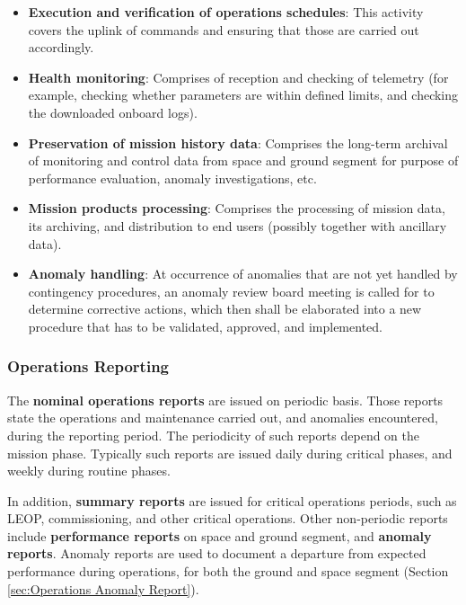 \begin{itemize}
\item \textbf{Execution and verification of operations schedules}: This activity covers the uplink of commands and ensuring that those are carried out accordingly.

\item \textbf{Health monitoring}: Comprises of reception and checking of telemetry (for example, checking whether parameters are within defined limits, and checking the downloaded onboard logs).  

\item \textbf{Preservation of mission history data}: Comprises the long-term archival of monitoring and control data from space and ground segment for purpose of performance evaluation, anomaly investigations, etc.

\item \textbf{Mission products processing}: Comprises the processing of mission data, its archiving, and distribution to end users (possibly together with ancillary data).

\item \textbf{Anomaly handling}: At occurrence of anomalies that are not yet handled by contingency procedures, an anomaly review board meeting is called for to determine corrective actions, which then shall be elaborated into a new procedure that has to be validated, approved, and implemented.

\end{itemize}

\subsubsection{Operations Reporting} 
\label{sec:Operations Reporting}

The \textbf{nominal operations reports} are issued on periodic basis. Those reports state the operations and maintenance carried out, and anomalies encountered, during the reporting period. The periodicity of such reports depend on the mission phase. Typically such reports are issued daily during critical phases, and weekly during routine phases.

In addition, \textbf{summary reports} are issued for critical operations periods, such as LEOP, commissioning, and other critical operations. Other non-periodic reports include \textbf{performance reports} on space and ground segment, and \textbf{anomaly reports}. Anomaly reports are used to document a departure from expected performance during operations, for both the ground and space segment (Section \ref{sec:Operations Anomaly Report}).

